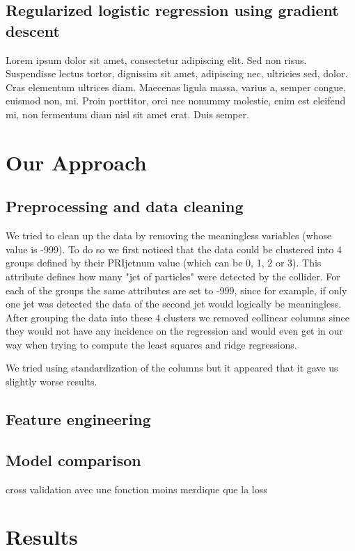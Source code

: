 \documentclass[10pt,conference,compsocconf]{IEEEtran}
\begin{document}
\subsection{Regularized logistic regression using gradient descent}
Lorem ipsum dolor sit amet, consectetur adipiscing elit. Sed non risus. Suspendisse lectus tortor, dignissim sit amet, adipiscing nec, ultricies sed, dolor. Cras elementum ultrices diam. Maecenas ligula massa, varius a, semper congue, euismod non, mi. Proin porttitor, orci nec nonummy molestie, enim est eleifend mi, non fermentum diam nisl sit amet erat. Duis semper. 


\section{Our Approach}

\subsection{Preprocessing and data cleaning}
We tried to clean up the data by removing the meaningless variables (whose value is -999). To do so we first noticed that the data could be clustered into 4 groups defined by their PRIjetnum value (which can be 0, 1, 2 or 3). This attribute defines how many "jet of particles" were detected by the collider. For each of the groups the same attributes are set to -999, since for example, if only one jet was detected the data of the second jet would logically be meaningless. After grouping the data into these 4 clusters we removed collinear columns since they would not have any incidence on the regression and would even get in our way when trying to compute the least squares and ridge regressions.

We tried using standardization of the columns but it appeared that it gave us slightly worse results.

\subsection{Feature engineering}
\subsection{Model comparison}
cross validation avec une fonction moins merdique que la loss




\section{Results}
\end{document}
